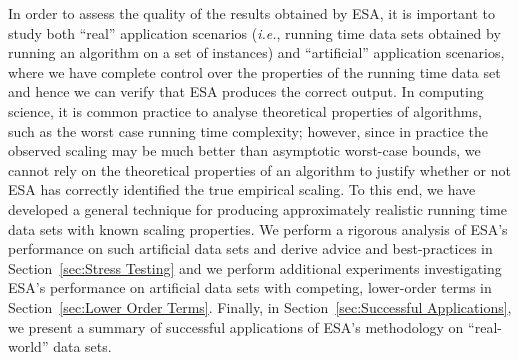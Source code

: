 \documentclass[aic]{iosart2x}
\newcommand{\ie}{\emph{i.e.}}
\begin{document}
In order to assess the quality of the results obtained by ESA, it is important to study both ``real'' application scenarios (\ie{}, running time data sets obtained by running an algorithm on a set of instances) and ``artificial'' application scenarios, where we have complete control over the properties of the running time data set and hence we can verify that ESA produces the correct output. In computing science, it is common practice to analyse theoretical properties of algorithms, such as the worst case running time complexity; however, since in practice the observed scaling may be much better than asymptotic worst-case bounds, we cannot rely on the theoretical properties of an algorithm to justify whether or not ESA has correctly identified the true empirical scaling. To this end, we have developed a general technique for producing approximately realistic running time data sets with known scaling properties. We perform a rigorous analysis of ESA's performance on such artificial data sets and derive advice and best-practices in Section~\ref{sec:Stress Testing} and we perform additional experiments investigating ESA's performance on artificial data sets with competing, lower-order terms in Section~\ref{sec:Lower Order Terms}. Finally, in Section~\ref{sec:Successful Applications}, we present a summary of successful applications of ESA's methodology on ``real-world'' data sets. 
\end{document}
